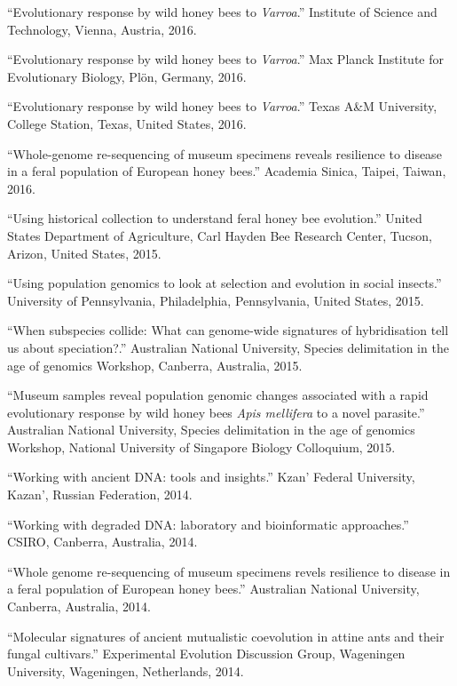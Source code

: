 \documentclass[11pt]{article}
\def\printdate#1{\xprintdate#1-}
\def\xprintdate#1-#2-#3-{#1}
\begin{document}
\ind ``Evolutionary response by wild honey bees to \textit{Varroa}.'' Institute of Science and Technology, Vienna, Austria, \printdate{2016-00-00}.


\ind ``Evolutionary response by wild honey bees to \textit{Varroa}.'' Max Planck Institute for Evolutionary Biology, Plön, Germany, \printdate{2016-00-00}.


\ind ``Evolutionary response by wild honey bees to \textit{Varroa}.'' Texas A\&M University, College Station, Texas, United States, \printdate{2016-00-00}.


\ind ``Whole-genome re-sequencing of museum specimens reveals resilience to
disease in a feral population of European honey bees.'' Academia Sinica, Taipei, Taiwan, \printdate{2016-00-00}.


\ind ``Using historical collection to understand feral honey bee evolution.'' United States Department of Agriculture, Carl Hayden Bee Research Center, Tucson, Arizon, United States, \printdate{2015-00-00}.


\ind ``Using population genomics to look at selection and evolution in social
insects.'' University of Pennsylvania, Philadelphia, Pennsylvania, United States, \printdate{2015-00-00}.


\ind ``When subspecies collide: What can genome-wide signatures of
hybridisation tell us about speciation?.'' Australian National University, Species delimitation in the age of
genomics Workshop, Canberra, Australia, \printdate{2015-00-00}.


\ind ``Museum samples reveal population genomic changes associated with a rapid
evolutionary response by wild honey bees \textit{Apis mellifera} to a
novel parasite.'' Australian National University, Species delimitation in the age of
genomics Workshop, National University of Singapore Biology Colloquium, \printdate{2015-00-00}.


\ind ``Working with ancient DNA: tools and insights.'' Kzan' Federal University, Kazan', Russian Federation, \printdate{2014-00-00}.


\ind ``Working with degraded DNA: laboratory and bioinformatic approaches.'' CSIRO, Canberra, Australia, \printdate{2014-00-00}.


\ind ``Whole genome re-sequencing of museum specimens revels resilience to
disease in a feral population of European honey bees.'' Australian National University, Canberra, Australia, \printdate{2014-00-00}.



\ind ``Molecular signatures of ancient mutualistic coevolution in attine ants
and their fungal cultivars.'' Experimental Evolution Discussion Group, Wageningen University, Wageningen, Netherlands, \printdate{2014-00-00}.
\end{document}
